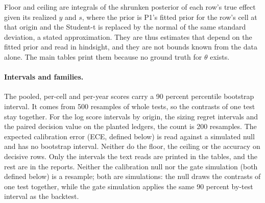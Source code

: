 \documentclass[sigconf,nonacm]{acmart}
\begin{document}
Floor and ceiling are integrals of the shrunken posterior of each row's true effect given its realized $y$ and $s$, where the prior is P1's fitted prior for the row's cell at that origin and the Student-t is replaced by the normal of the same standard deviation, a stated approximation. They are thus estimates that depend on the fitted prior and read in hindsight, and they are not bounds known from the data alone. The main tables print them because no ground truth for $\theta$ exists.

\paragraph{Intervals and families.} The pooled, per-cell and per-year scores carry a 90 percent percentile bootstrap interval. It comes from 500 resamples of whole tests, so the contrasts of one test stay together. For the log score intervals by origin, the sizing regret intervals and the paired decision value on the planted ledgers, the count is 200 resamples. The expected calibration error (ECE, defined below) is read against a simulated null and has no bootstrap interval. Neither do the floor, the ceiling or the accuracy on decisive rows. Only the intervals the text reads are printed in the tables, and the rest are in the reports. Neither the calibration null nor the gate simulation (both defined below) is a resample; both are simulations: the null draws the contrasts of one test together, while the gate simulation applies the same 90 percent by-test interval as the backtest.
\end{document}
